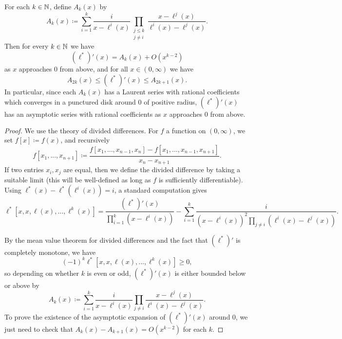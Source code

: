 \documentclass[letterpaper,11pt]{article}
\begin{document}
\begin{prop} For each $k \in \mathbb{N}$, define $A_k(x)$ by
\[
A_k(x) \coloneqq \sum_{i=1}^k \frac{i}{x - \ell^i(x)}\prod_{\substack{j \le k \\ j\ne i}}\frac{x-\ell^j(x)}{\ell^i(x)-\ell^j(x)}.
\]
Then for every $k \in \mathbb{N}$ we have
\[
(\ell^*)'(x) = A_k(x) + O(x^{k-2})
\]
as $x$ approaches $0$ from above, and for all $x \in (0,\infty)$ we have
\[
A_{2k}(x) \le (\ell^*)'(x) \le A_{2k+1}(x).
\]
In particular, since each $A_k(x)$ has a Laurent series with rational coefficients which converges in a punctured disk around $0$ of positive radius, $(\ell^*)'(x)$ has an asymptotic series with rational coefficients as $x$ approaches $0$ from above.
\end{prop}
\begin{proof} We use the theory of divided differences. For $f$ a function on $(0,\infty)$, we set $f[x] \coloneqq f(x)$, and recursively
\[
f[x_1, ..., x_{n+1}] \coloneqq \frac{f[x_1, ..., x_{n-1},x_n] - f[x_1, ..., x_{n-1},x_{n+1}]}{x_n - x_{n+1}}.
\]
If two entries $x_i, x_j$ are equal, then we define the divided difference by taking a suitable limit (this will be well-defined as long as $f$ is sufficiently differentiable). Using $\ell^*(x) - \ell^*(\ell^i(x)) = i$, a standard computation gives
\[
\ell^*[x,x,\ell(x),...,\ell^k(x)] = \frac{(\ell^*)'(x)}{\prod_{i=1}^k(x-\ell^i(x))} - \sum_{i=1}^k \frac{i}{(x - \ell^i(x))^2\prod_{j\ne i}(\ell^i(x) - \ell^j(x))}.
\]
\begin{comment}
and
\[
\ell^*[\varepsilon(x),x,x,\ell(x),...,\ell^{k-1}(x)] = -\frac{(\ell^*)'(x)}{(\varepsilon(x)-x)\prod_{i=1}^{k-1}(x-\ell^i(x))} + \frac{-1}{(\varepsilon(x)-x)^2\prod_{j}(\varepsilon(x) - \ell^j(x))} - \sum_{i=1}^{k-1} \frac{i}{(\varepsilon(x)-\ell^i(x))(x - \ell^i(x))^2\prod_{j\ne i}(\ell^i(x) - \ell^j(x))} \ge 0.
\]
\end{comment}
By the mean value theorem for divided differences and the fact that $(\ell^*)'$ is completely monotone, we have
\[
(-1)^k\ell^*[x,x,\ell(x),...,\ell^k(x)] \ge 0,
\]
so depending on whether $k$ is even or odd, $(\ell^*)'(x)$ is either bounded below or above by
\[
A_k(x) \coloneqq \sum_{i=1}^k \frac{i}{x - \ell^i(x)}\prod_{j\ne i}\frac{x-\ell^j(x)}{\ell^i(x)-\ell^j(x)}.
\]
To prove the existence of the asymptotic expansion of $(\ell^*)'(x)$ around $0$, we just need to check that $A_k(x) - A_{k+1}(x) = O(x^{k-2})$ for each $k$.


\end{proof}
\end{document}
